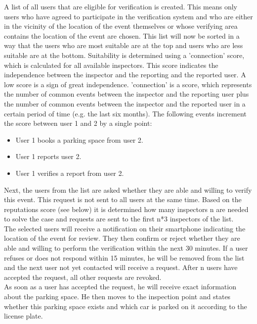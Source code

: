 A list of all users that are eligible for verification is created. This means only users who have agreed to participate in the verification system and who are either in the vicinity of the location of the event themselves or whose verifying area contains the location of the event are chosen. This list will now be sorted in a way that the users who are most suitable are at the top and users who are less suitable are at the bottom. Suitability is determined using a 'connection' score, which is calculated for all available inspectors. This score indicates the independence between the inspector and the reporting and the reported user. A low score is a sign of great independence. 'connection' is a score, which represents the number of common events between the inspector and the reporting user plus the number of common events between the inspector and the reported user in a certain period of time (e.g. the last six months). The following events increment the score between user 1 and 2 by a single point:
\begin{itemize}
\item User 1 books a parking space from user 2.
\item User 1 reports user 2.
\item User 1 verifies a report from user 2.
\end{itemize}

Next, the users from the list are asked whether they are able and willing to verify this event. This request is not sent to all users at the same time. Based on the reputations score (see below) it is determined how many inspectors n are needed to solve the case and requests are sent to the first n*3 inspectors of the list.\\

The selected users will receive a notification on their smartphone indicating the location of the event for review. They then confirm or reject whether they are able and willing to perform the verification within the next 30 minutes. If a user refuses or does not respond within 15 minutes, he will be removed from the list and the next user not yet contacted will receive a request. After n users have accepted the request, all other requests are revoked.\\

As soon as a user has accepted the request, he will receive exact information about the parking space. He then moves to the inspection point and states whether this parking space exists and which car is parked on it according to the license plate.\\

